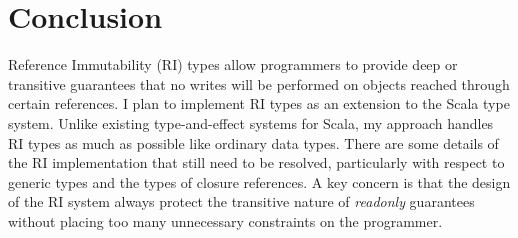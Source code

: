 \documentclass[letterpaper,11pt]{article}
\theoremstyle{definition}
\theoremstyle{remark}
\begin{document}





\section{Conclusion}
\label{conclusion}

Reference Immutability (RI) types allow programmers to provide deep
or transitive guarantees that no writes will be performed on objects
reached through certain references.
I plan to implement RI types as an extension to the Scala type system.
Unlike existing type-and-effect systems for Scala, my approach handles RI types
as much as possible like ordinary data types.
There are some details of the RI implementation that still need to be resolved,
particularly with respect to generic types and the types of closure references.
A key concern is that the design of the RI system always protect the
transitive nature of \emph{readonly} guarantees without placing too many
unnecessary constraints on the programmer.


%
%


\end{document}
